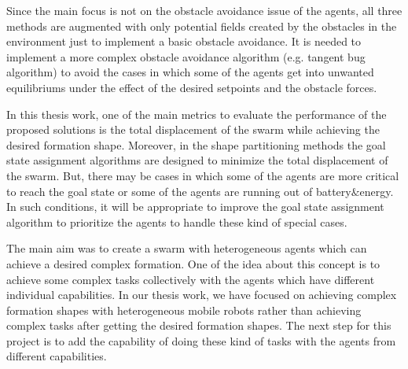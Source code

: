 Since the main focus is not on the obstacle avoidance issue of the agents, all three methods are augmented with only potential fields created by the obstacles in the environment just to implement a basic obstacle avoidance. It is needed to implement a more complex obstacle avoidance algorithm (e.g. tangent bug algorithm) to avoid the cases in which some of the agents get into unwanted equilibriums under the effect of the desired setpoints and the obstacle forces.
    
In this thesis work, one of the main metrics to evaluate the performance of the proposed solutions is the total displacement of the swarm while achieving the desired formation shape. Moreover, in the shape partitioning methods the goal state assignment algorithms are designed to minimize the total displacement of the swarm. But, there may be cases in which some of the agents are more critical to reach the goal state or some of the agents are running out of battery$\&$energy. In such conditions, it will be appropriate to improve the goal state assignment algorithm to prioritize the agents to handle these kind of special cases. 
    
The main aim was to create a swarm with heterogeneous agents which can achieve a desired complex formation. One of the idea about this concept is to achieve some complex tasks collectively with the agents which have different individual capabilities. In our thesis work, we have focused on achieving complex formation shapes with heterogeneous mobile robots rather than achieving complex tasks after getting the desired formation shapes. The next step for this project is to add the capability of doing these kind of tasks with the agents from different capabilities.
		
		
		
		
		
		
		
		
		
		
		
		
		
		
		
		
		